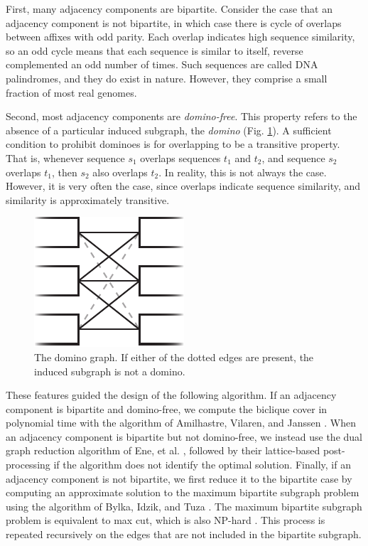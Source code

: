 \documentclass[11pt]{ucthesis}
\newcommand{\figref}[1]{Fig. \ref{fig:#1}}
\begin{document}
First, many adjacency components are bipartite.
Consider the case that an adjacency component is not bipartite, in which case there is cycle of overlaps between affixes with odd parity.
Each overlap indicates high sequence similarity, so an odd cycle means that each sequence is similar to itself, reverse complemented an odd number of times.
Such sequences are called DNA palindromes, and they do exist in nature.
However, they comprise a small fraction of most real genomes.

Second, most adjacency components are \emph{domino-free}. 
This property refers to the absence of a particular induced subgraph, the \emph{domino} (\figref{domino}).
A sufficient condition to prohibit dominoes is for overlapping to be a transitive property.
That is, whenever sequence $s_1$ overlaps sequences $t_1$ and $t_2$, and sequence $s_2$ overlaps $t_1$, then $s_2$ also overlaps $t_2$.
In reality, this is not always the case.
However, it is very often the case, since overlaps indicate sequence similarity, and similarity is approximately transitive.
    
\begin{figure}
\begin{center}
\includegraphics[width=.2\textwidth]{bluntfigures/domino.pdf}
\caption{The domino graph. If either of the dotted edges are present, the induced subgraph is not a domino.} \label{fig:domino}
\end{center}
\end{figure}

These features guided the design of the following algorithm. If an adjacency component is bipartite and domino-free, we compute the biclique cover in polynomial time with the algorithm of Amilhastre, Vilaren, and Janssen \cite{amilhastre1998complexity}.
When an adjacency component is bipartite but not domino-free, we instead use the dual graph reduction algorithm of Ene, et al. \cite{ene2008fast}, followed by their lattice-based post-processing if the algorithm does not identify the optimal solution.
Finally, if an adjacency component is not bipartite, we first reduce it to the bipartite case by computing an approximate solution to the maximum bipartite subgraph problem using the algorithm of Bylka, Idzik, and Tuza \cite{bylka1999maximum}. 
The maximum bipartite subgraph problem is equivalent to max cut, which is also NP-hard \cite{karp1972reducibility}.
This process is repeated recursively on the edges that are not included in the bipartite subgraph.
\end{document}
